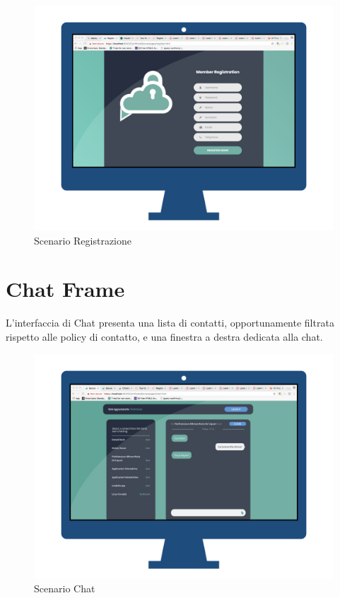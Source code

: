\begin{figure}[!htbp]
	\centering
	\includegraphics[scale = .3]{img/conclusioni003.jpeg}
	\caption{Scenario Registrazione}
	\label{gfx:sdregister}
\end{figure}


\section{Chat Frame}

L'interfaccia di Chat presenta una lista di contatti, opportunamente filtrata rispetto alle policy di contatto, e una finestra a destra dedicata alla chat.

\begin{figure}[!htbp]
	\centering
	\includegraphics[scale = .3]{img/conclusioni001.jpeg}
	\caption{Scenario Chat}
	\label{gfx:sdchat}
\end{figure}
